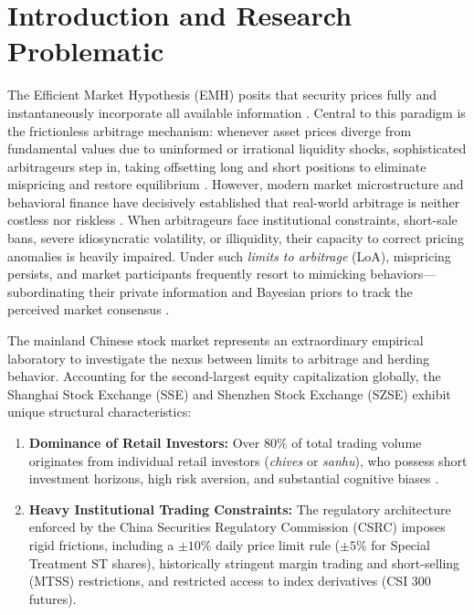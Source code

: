 \documentclass[12pt, a4paper]{article}
\begin{document}
\newpage
\tableofcontents
\newpage

\section{Introduction and Research Problematic}

The Efficient Market Hypothesis (EMH) posits that security prices fully and instantaneously incorporate all available information \citep{Fama1970}. Central to this paradigm is the frictionless arbitrage mechanism: whenever asset prices diverge from fundamental values due to uninformed or irrational liquidity shocks, sophisticated arbitrageurs step in, taking offsetting long and short positions to eliminate mispricing and restore equilibrium \citep{Sharpe1964, Ross1976}. However, modern market microstructure and behavioral finance have decisively established that real-world arbitrage is neither costless nor riskless \citep{Shleifer1997}. When arbitrageurs face institutional constraints, short-sale bans, severe idiosyncratic volatility, or illiquidity, their capacity to correct pricing anomalies is heavily impaired. Under such \emph{limits to arbitrage} (LoA), mispricing persists, and market participants frequently resort to mimicking behaviors---subordinating their private information and Bayesian priors to track the perceived market consensus \citep{Scharfstein1990, Bikhchandani2001}.

The mainland Chinese stock market represents an extraordinary empirical laboratory to investigate the nexus between limits to arbitrage and herding behavior. Accounting for the second-largest equity capitalization globally, the Shanghai Stock Exchange (SSE) and Shenzhen Stock Exchange (SZSE) exhibit unique structural characteristics:

\begin{enumerate}[label=\arabic*.]
  \item \textbf{Dominance of Retail Investors:} Over $80\%$ of total trading volume originates from individual retail investors (\emph{chives} or \emph{sanhu}), who possess short investment horizons, high risk aversion, and substantial cognitive biases \citep{Tan2008}.
  \item \textbf{Heavy Institutional Trading Constraints:} The regulatory architecture enforced by the China Securities Regulatory Commission (CSRC) imposes rigid frictions, including a $\pm10\%$ daily price limit rule ($\pm5\%$ for Special Treatment ST shares), historically stringent margin trading and short-selling (MTSS) restrictions, and restricted access to index derivatives (CSI 300 futures).
\end{enumerate}
\end{document}
